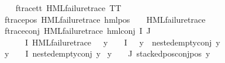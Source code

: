 \begin{isabellebody}
\ \ \isanewline
f{\isacharunderscore}{\kern0pt}trace{\isacharunderscore}{\kern0pt}tt{\isacharcolon}{\kern0pt}\ {\isachardoublequoteopen}HML{\isacharunderscore}{\kern0pt}failure{\isacharunderscore}{\kern0pt}trace\ TT{\isachardoublequoteclose}\ {\isacharbar}{\kern0pt}\isanewline
f{\isacharunderscore}{\kern0pt}trace{\isacharunderscore}{\kern0pt}pos{\isacharcolon}{\kern0pt}\ {\isachardoublequoteopen}HML{\isacharunderscore}{\kern0pt}failure{\isacharunderscore}{\kern0pt}trace\ {\isacharparenleft}{\kern0pt}hml{\isacharunderscore}{\kern0pt}pos\ {\isasymalpha}\ {\isasymphi}{\isacharparenright}{\kern0pt}{\isachardoublequoteclose}\ \ {\isachardoublequoteopen}HML{\isacharunderscore}{\kern0pt}failure{\isacharunderscore}{\kern0pt}trace\ {\isasymphi}{\isachardoublequoteclose}{\isacharbar}{\kern0pt}\isanewline
f{\isacharunderscore}{\kern0pt}trace{\isacharunderscore}{\kern0pt}conj{\isacharcolon}{\kern0pt}\ {\isachardoublequoteopen}HML{\isacharunderscore}{\kern0pt}failure{\isacharunderscore}{\kern0pt}trace\ {\isacharparenleft}{\kern0pt}hml{\isacharunderscore}{\kern0pt}conj\ I\ J\ {\isasymPhi}{\isacharparenright}{\kern0pt}{\isachardoublequoteclose}\isanewline
{}\ {\isachardoublequoteopen}{\isacharparenleft}{\kern0pt}{\isacharparenleft}{\kern0pt}{\isasymexists}{\isasympsi}\ {\isasymin}\ {\isacharparenleft}{\kern0pt}{\isasymPhi}\ {\isacharbackquote}{\kern0pt}\ I{\isacharparenright}{\kern0pt}{\isachardot}{\kern0pt}\ {\isacharparenleft}{\kern0pt}HML{\isacharunderscore}{\kern0pt}failure{\isacharunderscore}{\kern0pt}trace\ {\isasympsi}{\isacharparenright}{\kern0pt}\ {\isasymand}\ {\isacharparenleft}{\kern0pt}{\isasymforall}y\ {\isasymin}\ {\isacharparenleft}{\kern0pt}{\isasymPhi}\ {\isacharbackquote}{\kern0pt}\ I{\isacharparenright}{\kern0pt}{\isachardot}{\kern0pt}\ {\isasympsi}\ {\isasymnoteq}\ y\ {\isasymlongrightarrow}\ nested{\isacharunderscore}{\kern0pt}empty{\isacharunderscore}{\kern0pt}conj\ y{\isacharparenright}{\kern0pt}{\isacharparenright}{\kern0pt}\ {\isasymor}\ \isanewline
{\isacharparenleft}{\kern0pt}{\isasymforall}y\ {\isasymin}\ {\isacharparenleft}{\kern0pt}{\isasymPhi}\ {\isacharbackquote}{\kern0pt}\ I{\isacharparenright}{\kern0pt}{\isachardot}{\kern0pt}\ nested{\isacharunderscore}{\kern0pt}empty{\isacharunderscore}{\kern0pt}conj\ y{\isacharparenright}{\kern0pt}{\isacharparenright}{\kern0pt}\ {\isasymand}\isanewline
{\isacharparenleft}{\kern0pt}{\isasymforall}y\ {\isasymin}\ {\isacharparenleft}{\kern0pt}{\isasymPhi}\ {\isacharbackquote}{\kern0pt}\ J{\isacharparenright}{\kern0pt}{\isachardot}{\kern0pt}\ stacked{\isacharunderscore}{\kern0pt}pos{\isacharunderscore}{\kern0pt}conj{\isacharunderscore}{\kern0pt}pos\ y{\isacharparenright}{\kern0pt}{\isachardoublequoteclose}\isanewline

\end{isabellebody}
